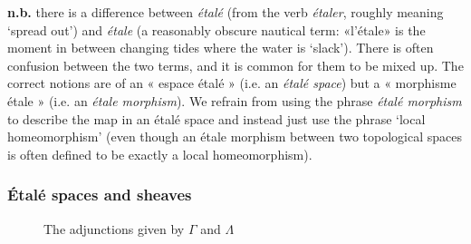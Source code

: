 \documentclass[10pt]{article}
\newcommand{\Set}{\mathsf{Set}}
\newcommand{\Top}{\mathsf{Top}}
\newcommand{\Etale}{\mathsf{\acute{E}tal\acute{e}}\,}
\newcommand{\Cover}{\mathsf{Cover}}
\newcommand{\lc}{\mathrm{l.c.}}
\newcommand{\pre}{\text{pre}}
\begin{document}
                \textbf{n.b.} there is a difference between \textit{étalé} (from the verb \textit{étaler}, roughly meaning `spread out') and \textit{étale} (a reasonably obscure nautical term: «l'étale» is the moment in between changing tides where the water is `slack').
                    There is often confusion between the two terms, and it is common for them to be mixed up.
                    The correct notions are of an « espace étalé » (i.e. an \textit{étalé space}) but a « morphisme étale » (i.e. an \textit{étale morphism}).
                    We refrain from using the phrase \textit{étalé morphism} to describe the map in an étalé space and instead just use the phrase `local homeomorphism' (even though an étale morphism between two topological spaces is often defined to be exactly a local homeomorphism).
        
            \subsubsection{Étalé spaces and sheaves}
                
                \begin{figure}[h!]
                    \centering
                    \caption{The adjunctions given by $\Gamma$ and $\Lambda$}
                    \label{figure:adjunction-diagram-gamma-lambda}
                \end{figure}  
                                   
\end{document}
